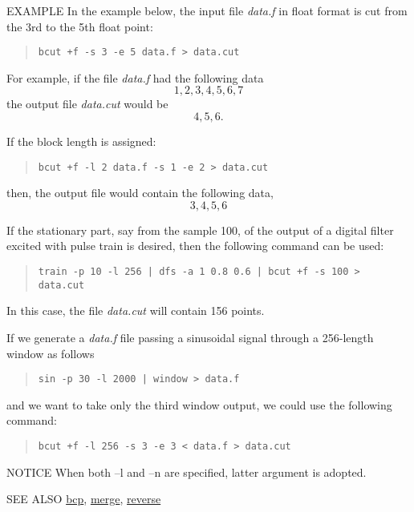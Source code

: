 \begin{qsection}{EXAMPLE}
In the example below, the input file {\em data.f} in float format
is cut from the 3rd to the 5th float point:
\begin{quote}
 \verb!bcut +f -s 3 -e 5 data.f > data.cut!
\end{quote}
For example, if the file {\em data.f} had the following data
\begin{displaymath}
  1, 2, 3, 4, 5, 6, 7
\end{displaymath}
the output file {\em data.cut} would be 
\begin{displaymath}
  4, 5, 6.
\end{displaymath}
\par
If the block length is assigned:
\begin{quote}
 \verb!bcut +f -l 2 data.f -s 1 -e 2 > data.cut!
\end{quote}
then, the output file would contain the following data,
\begin{displaymath}
  3, 4, 5, 6
\end{displaymath}
\par
If the stationary part, say from the sample 100,
of the output of a digital filter excited with
pulse train is desired, then the following command can be used:
\begin{quote}
  \verb!train -p 10 -l 256 | dfs -a 1 0.8 0.6 | bcut +f -s 100 > data.cut!
\end{quote}
In this case, the file {\em data.cut} will contain 156 points.
\par
If we generate a {\em data.f} file passing a sinusoidal signal
through a 256-length window as follows
\begin{quote}
  \verb!sin -p 30 -l 2000 | window > data.f!
\end{quote}
and we want to take only the third window output,
we could use the following command:
\begin{quote}
  \verb!bcut +f -l 256 -s 3 -e 3 < data.f > data.cut!
\end{quote}
\end{qsection}

\begin{qsection}{NOTICE}
When both --l and --n are specified, latter argument is adopted.
\end{qsection}

\begin{qsection}{SEE ALSO}
\hyperlink{bcp}{bcp},
\hyperlink{merge}{merge},
\hyperlink{reverse}{reverse}
\end{qsection}
